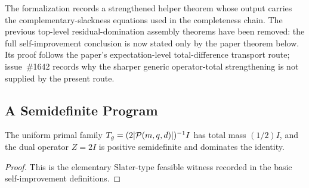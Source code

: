 \begin{remark}\label{rem:self-improvement-helper-with-slackness-theorem}
  The formalization records a strengthened helper theorem whose output carries
  the complementary-slackness equations used in the completeness chain.  The
  previous top-level residual-domination assembly theorems have been removed:
  the full self-improvement conclusion is now stated only by the paper theorem
  below.  Its proof follows the paper's expectation-level total-difference
  transport route; issue~\#1642 records why the sharper generic operator-total
  strengthening is not supplied by the present route.
\end{remark}

\subsection{A Semidefinite Program}

\begin{lemma}\label{lem:sdp-uniform-feasible-witness}
  \leanok
  The uniform primal family
  \(T_g=(2|\mathcal{P}(m,q,d)|)^{-1}I\) has total mass \((1/2)I\), and the dual
  operator \(Z=2I\) is positive semidefinite and dominates the identity.
\end{lemma}
\begin{proof}
  \leanok
  This is the elementary Slater-type feasible witness recorded in the basic
  self-improvement definitions.
\end{proof}

